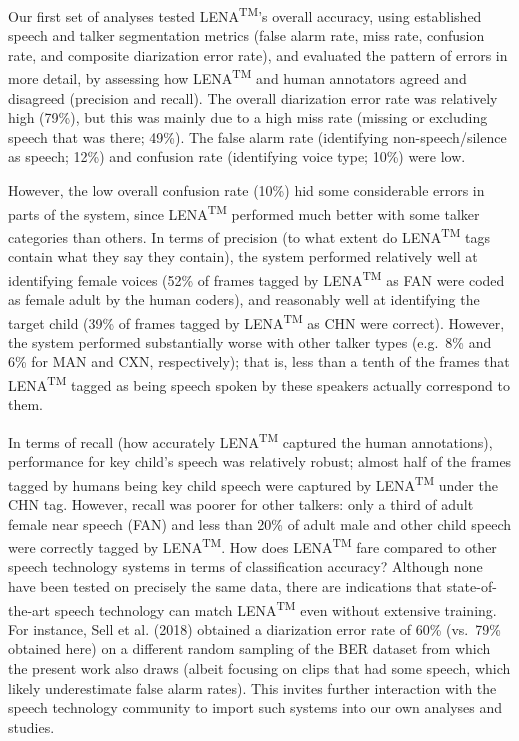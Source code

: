 \documentclass[english,floatsintext,man]{apa6}
\begin{document}
Our first set of analyses tested LENA\textsuperscript{TM}'s overall
accuracy, using established speech and talker segmentation metrics
(false alarm rate, miss rate, confusion rate, and composite diarization
error rate), and evaluated the pattern of errors in more detail, by
assessing how LENA\textsuperscript{TM} and human annotators agreed and
disagreed (precision and recall). The overall diarization error rate was
relatively high (79\%), but this was mainly due to a high miss rate
(missing or excluding speech that was there; 49\%). The false alarm rate
(identifying non-speech/silence as speech; 12\%) and confusion rate
(identifying voice type; 10\%) were low.

However, the low overall confusion rate (10\%) hid some considerable
errors in parts of the system, since LENA\textsuperscript{TM} performed
much better with some talker categories than others. In terms of
precision (to what extent do LENA\textsuperscript{TM} tags contain what
they say they contain), the system performed relatively well at
identifying female voices (52\% of frames tagged by
LENA\textsuperscript{TM} as FAN were coded as female adult by the human
coders), and reasonably well at identifying the target child (39\% of
frames tagged by LENA\textsuperscript{TM} as CHN were correct). However,
the system performed substantially worse with other talker types
(e.g.~8\% and 6\% for MAN and CXN, respectively); that is, less than a
tenth of the frames that LENA\textsuperscript{TM} tagged as being speech
spoken by these speakers actually correspond to them.

In terms of recall (how accurately LENA\textsuperscript{TM} captured the
human annotations), performance for key child's speech was relatively
robust; almost half of the frames tagged by humans being key child
speech were captured by LENA\textsuperscript{TM} under the CHN tag.
However, recall was poorer for other talkers: only a third of adult
female near speech (FAN) and less than 20\% of adult male and other
child speech were correctly tagged by LENA\textsuperscript{TM}. How does
LENA\textsuperscript{TM} fare compared to other speech technology
systems in terms of classification accuracy? Although none have been
tested on precisely the same data, there are indications that
state-of-the-art speech technology can match LENA\textsuperscript{TM}
even without extensive training. For instance, Sell et al. (2018)
obtained a diarization error rate of 60\% (vs.~79\% obtained here) on a
different random sampling of the BER dataset from which the present work
also draws (albeit focusing on clips that had some speech, which likely
underestimate false alarm rates). This invites further interaction with
the speech technology community to import such systems into our own
analyses and studies.
\end{document}
